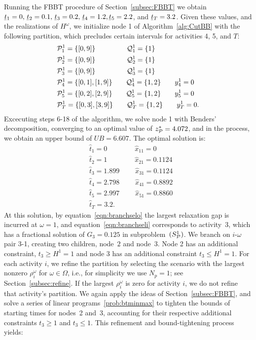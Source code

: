 \documentclass[11pt]{article}
\newcommand{\cQ}{{\cal Q}}
\newcommand{\cP}{{\cal P}}
\renewcommand{\underbar}{\underaccent{\bar}}
\begin{document}
	Running the FBBT procedure of Section~\ref{subsec:FBBT} we obtain $\underbar{t}_1=0, \, \underbar{t}_2=0.1, \, \underbar{t}_3=0.2, \, \underbar{t}_4=1.2,\underbar{t}_5=2.2$, and $\underbar{t}_T=3.2$. Given these values, and the realizations of $H^\omega$, we initialize node 1 of Algorithm~\ref{alg:CutBB} with the following partition, which precludes certain intervals for activities 4, 5, and $T$:
	\begin{align*}
	    &\cP_1^1 = \{[0,9]\} \qquad \qquad \;\; \cQ_1^1 = \{1\}\\
	    &\cP_2^1 = \{[0,9]\} \qquad \qquad \;\; \cQ_2^1 = \{1\}\\
	    &\cP_3^1 = \{[0,9]\} \qquad \qquad \;\; \cQ_3^1 = \{1\}\\
	    &\cP_4^1 = \{[0,1],[1,9]\} \qquad  \cQ_4^1 = \{1,2\} \qquad y_4^1 = 0\\
	    &\cP_5^1 = \{[0,2],[2,9]\} \qquad  \cQ_5^1 = \{1,2\} \qquad y_5^1 = 0\\
	    &\cP_T^1 = \{[0,3],[3,9]\} \qquad  \cQ_T^1 = \{1,2\} \qquad y_T^1 = 0.
	\end{align*}
	Excecuting steps 6-18 of the algorithm, we solve node 1 with Benders' decomposition, converging to an optimal value of \(z^*_{\cP} = 4.072\), and in the process, we obtain an upper bound of \(UB = 6.607\). The optimal solution is:
	\begin{align*}
	    & \hat{t}_1 = 0 \qquad \qquad \hat{x}_{11} = 0\\
	    & \hat{t}_2 = 1 \qquad \qquad \hat{x}_{21} = 0.1124\\
	    & \hat{t}_3 = 1.899 \qquad \; \hat{x}_{31} = 0.1124\\
	    & \hat{t}_4 = 2.798 \qquad \; \hat{x}_{41} = 0.8892\\
	    & \hat{t}_5 = 2.997 \qquad \; \hat{x}_{51} = 0.8860 \\
	    & \hat{t}_T = 3.2.
	\end{align*}
	 At this solution, by equation~\eqref{eqn:branchselo} the largest relaxation gap is incurred at \({\omega} = 1\), 
	 and equation~\eqref{eqn:branchseli} corresponds to activity~3, which has a fractional solution of \(G_3 = 0.125\) in subproblem~\((S^1_\cP)\). We branch on $i$-$\omega$ pair 3-1, creating two children, node~\(2\) and node~\(3\). Node 2 has an additional constraint, \(t_3 \geq H^1 = 1\) and node 3 has an additional constraint \(t_3 \leq H^1 = 1\). For each activity \(i\), we refine the partition by selecting the scenario with the largest nonzero \(\rho_i^\omega\) for \(\omega \in \Omega\), i.e., for simplicity we use $N_p=1$; see Section~\ref{subsec:refine}. If the largest \(\rho_i^\omega\) is zero for activity $i$, we do not refine that activity's partition. We again apply the ideas of Section~\ref{subsec:FBBT}, and solve a series of linear programs~\eqref{prob:btminmax} to tighten the bounds of starting times for nodes~2 and~3, accounting for their respective additional constraints \(t_3 \geq 1\) and \(t_3 \leq 1\). This refinement and bound-tightening process yields:
\end{document}
